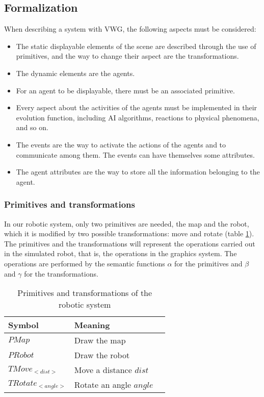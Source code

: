 \documentclass{aamas2012}
\begin{document}
\subsection{Formalization}

When describing a system with VWG, the following aspects must be considered:
\begin{itemize}
\item The static displayable elements of the scene are described through the use of primitives, and the way to change their aspect are the transformations.
\item The dynamic elements are the agents.
\item For an agent to be displayable, there must be an associated primitive. 
\item Every aspect about the activities of the agents must be implemented in their evolution function, including AI algorithms, reactions to physical phenomena, and so on.
\item The events are the way to activate the actions of the agents and to communicate among them. The events can have themselves some attributes.
\item The agent attributes are the way to store all the information belonging to the agent.
\end{itemize}

\subsubsection{Primitives and transformations}

In our robotic system, only two primitives are needed, the map and the robot, which it is modified by two possible transformations: move and rotate (table \ref{tab:PrimTransf}). The primitives and the transformations will represent the operations carried out in the simulated robot, that is, the operations in the graphics system. The operations are performed by the semantic functions $\alpha$ for the primitives and $\beta$ and $\gamma$ for the transformations.

\begin{table}
\centering
\caption{Primitives and transformations of the robotic system}
\label {tab:PrimTransf}
\begin{tabular} {|l|l|l|}
\hline
Symbol & Meaning \\
\hline
\hline
$PMap$ & Draw the map\\ 
\hline
$PRobot$ & Draw the robot\\ 
\hline
$TMove_{<dist>}$ & Move a distance $dist$ \\
\hline
$TRotate_{<angle>}$ & Rotate an angle $angle$ \\
\hline
\end{tabular}
\end{table}
\end{document}
